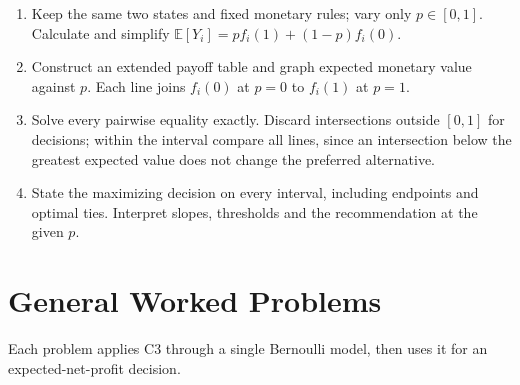 \begin{enumerate}
\item Keep the same two states and fixed monetary rules; vary only $p\in[0,1]$.
Calculate and simplify $\mathbb E[Y_i]=p f_i(1)+(1-p)f_i(0)$.
\item Construct an extended payoff table and graph expected monetary value
against $p$. Each line joins $f_i(0)$ at $p=0$ to $f_i(1)$ at $p=1$.
\item Solve every pairwise equality exactly. Discard intersections outside
$[0,1]$ for decisions; within the interval compare all lines, since an intersection
below the greatest expected value does not change the preferred alternative.
\item State the maximizing decision on every interval, including endpoints
and optimal ties. Interpret slopes, thresholds and the recommendation at the given $p$.
\end{enumerate}
\clearpage
\section{General Worked Problems}\label{sec:t2-c3-general}
Each problem applies C3 through a single Bernoulli model, then uses it for an expected-net-profit decision.
